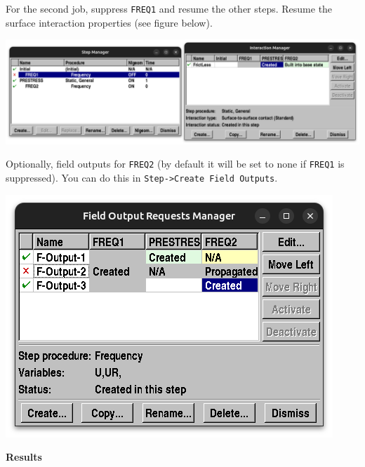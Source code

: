 \documentclass[11pt]{article}
\begin{document}
\begin{enumerate}
\begin{center}
\end{center}
For the second job, suppress \texttt{FREQ1} and resume the other steps. Resume the surface interaction properties (see figure below).
\begin{center}
\includegraphics[width=.9\linewidth]{./figs/run2.png}
\end{center}
Optionally, field outputs for \texttt{FREQ2} (by default it will be set to none if \texttt{FREQ1} is suppressed).
You can do this in \texttt{Step->Create Field Outputs}.
\begin{center}
\includegraphics[width=.9\linewidth]{./figs/run2_fo.png}
\end{center}
\end{enumerate}
\textbf{Results}
\end{document}
